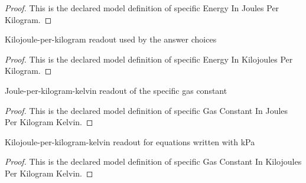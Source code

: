 \begin{proof}
  This is the declared model definition of specific Energy In Joules Per Kilogram.
\end{proof}
\begin{definition}
  \label{def:physics:phyx-mini-0459:phyxminiproblems-problemphyxmini0459-specificenergyinkilojoulesperkilogram}
  Kilojoule-per-kilogram readout used by the answer choices
\end{definition}
\begin{proof}
  This is the declared model definition of specific Energy In Kilojoules Per Kilogram.
\end{proof}
\begin{definition}
  \label{def:physics:phyx-mini-0459:phyxminiproblems-problemphyxmini0459-specificgasconstantinjoulesperkilogramkelvin}
  Joule-per-kilogram-kelvin readout of the specific gas constant
\end{definition}
\begin{proof}
  This is the declared model definition of specific Gas Constant In Joules Per Kilogram Kelvin.
\end{proof}
\begin{definition}
  \label{def:physics:phyx-mini-0459:phyxminiproblems-problemphyxmini0459-specificgasconstantinkilojoulesperkilogramkelvin}
  Kilojoule-per-kilogram-kelvin readout for equations written with kPa
\end{definition}
\begin{proof}
  This is the declared model definition of specific Gas Constant In Kilojoules Per Kilogram Kelvin.
\end{proof}
